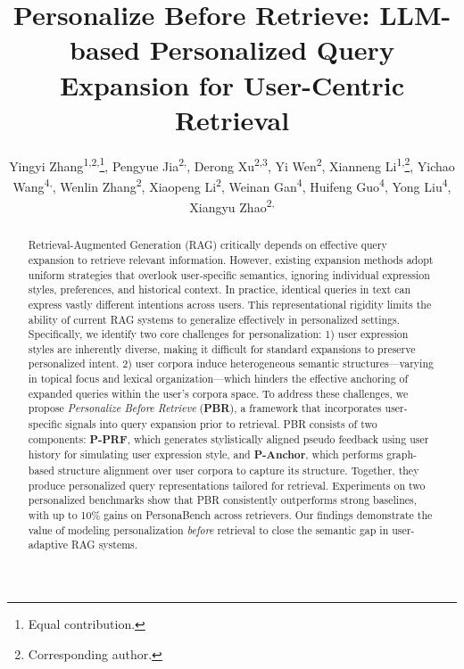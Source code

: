 \documentclass[letterpaper]{article} %
\title{Personalize Before Retrieve: LLM-based Personalized Query Expansion for User-Centric Retrieval}
\author {
    Yingyi Zhang\textsuperscript{\rm {1,2,}}\thanks{Equal contribution.},
    Pengyue Jia\textsuperscript{\rm {2,}}\footnotemark[1],
    Derong Xu\textsuperscript{\rm {2,3}},
    Yi Wen\textsuperscript{\rm {2}},
    Xianneng Li\textsuperscript{\rm {1,}}\thanks{Corresponding author.},
    Yichao Wang\textsuperscript{\rm 4,}\footnotemark[2],
    Wenlin Zhang\textsuperscript{\rm {2}},
    Xiaopeng Li\textsuperscript{\rm {2}},
    Weinan Gan\textsuperscript{\rm 4},
    Huifeng Guo\textsuperscript{\rm 4},
    Yong Liu\textsuperscript{\rm 4},
    Xiangyu Zhao\textsuperscript{\rm {2,}}\footnotemark[2]
}
\begin{document}
\maketitle

\begin{abstract}
Retrieval-Augmented Generation (RAG) critically depends on effective query expansion to retrieve relevant information. However, existing expansion methods adopt uniform strategies that overlook user-specific semantics, ignoring individual expression styles, preferences, and historical context. In practice, identical queries in text can express vastly different intentions across users. 
This representational rigidity limits the ability of current RAG systems to generalize effectively in personalized settings. Specifically, we identify two core challenges for personalization: 1) user expression styles are inherently diverse, making it difficult for standard expansions to preserve personalized intent. 2) user corpora induce heterogeneous semantic structures—varying in topical focus and lexical organization—which hinders the effective anchoring of expanded queries within the user’s corpora space.
To address these challenges, we propose \textit{Personalize Before Retrieve} (\textbf{PBR}), a framework that incorporates user-specific signals into query expansion prior to retrieval.
PBR consists of two components: \textbf{P-PRF}, which generates stylistically aligned pseudo feedback using user history for simulating user expression style, and \textbf{P-Anchor}, which performs graph-based structure alignment over user corpora to capture its structure. Together, they produce personalized query representations tailored for retrieval.
Experiments on two personalized benchmarks show that PBR consistently outperforms strong baselines, with up to 10\% gains on PersonaBench across retrievers.
Our findings demonstrate the value of modeling personalization \emph{before} retrieval to close the semantic gap in user-adaptive RAG systems. 


\end{abstract}
\end{document}
